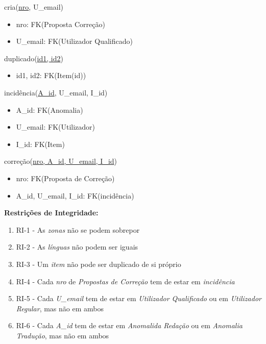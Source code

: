 \documentclass[12pt]{report}
\begin{document}
\begin{multicols}{2}
\vspace{5mm}


cria(\underline{nro}, U\_email)
    \begin{itemize}
    \item nro: FK(Proposta Correção)
    \item U\_email: FK(Utilizador Qualificado)
    \end{itemize}   


\vspace{5mm}



duplicado(\underline{id1, id2})
    \begin{itemize}
	    \item id1, id2: FK(Item(id))
    \end{itemize}


\vspace{5mm}

incidência(\underline{A\_id}, U\_email, I\_id)
    \begin{itemize}
    \item A\_id: FK(Anomalia)
    \item U\_email: FK(Utilizador)
    \item I\_id: FK(Item)
    \end{itemize}


\vspace{5mm}


correção(\underline{nro, A\_id, U\_email, I\_id})
    \begin{itemize}
    \item nro: FK(Proposta de Correção)
    \item A\_id, U\_email, I\_id: FK(incidência)
    \end{itemize}

\end{multicols}

\Large
\textbf{Restrições de Integridade: }\\

\normalsize
\begin{enumerate}
    \item RI-1 - As \textit{zonas} não se podem sobrepor
    \item RI-2 - As \textit{línguas} não podem ser iguais
    \item RI-3 - Um \textit{item} não pode ser duplicado de si próprio
    \item RI-4 - Cada \textit{nro} de \textit{Propostas de Correção} tem de estar em \textit{incidência}
    \item RI-5 - Cada \textit{U\_email} tem de estar em \textit{Utilizador Qualificado} ou em \textit{Utilizador Regular}, mas não em ambos
    \item RI-6 - Cada \textit{A\_id} tem de estar em \textit{Anomalida Redação} ou em \textit{Anomalia Tradução}, mas não em ambos
    
\end{enumerate}
\end{document}
